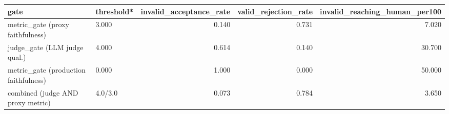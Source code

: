 \begin{tabular}{llrrr}
\toprule
gate & threshold* & invalid_acceptance_rate & valid_rejection_rate & invalid_reaching_human_per100 \\
\midrule
metric_gate (proxy faithfulness) & 3.000 & 0.140 & 0.731 & 7.020 \\
judge_gate (LLM judge qual.) & 4.000 & 0.614 & 0.140 & 30.700 \\
metric_gate (production faithfulness) & 0.000 & 1.000 & 0.000 & 50.000 \\
combined (judge AND proxy metric) & 4.0/3.0 & 0.073 & 0.784 & 3.650 \\
\bottomrule
\end{tabular}
